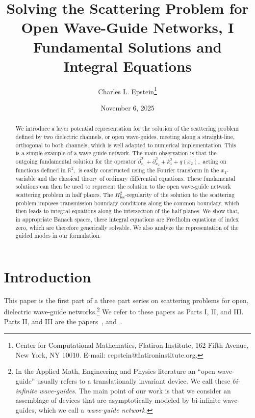 \documentclass[11pt]{article}
\newcommand{\Bk}{\color{black}}
\newcommand{\Rd}{\color{black}}
\newcommand\loc{\operatorname{loc}}
\newcommand\bbR{\mathbb R}
\newcommand\pa{\partial}
\theoremstyle{definition}
\theoremstyle{remark}
\begin{document}
\title{Solving the Scattering Problem for Open Wave-Guide Networks,
  I\\Fundamental Solutions and Integral Equations}

\author{Charles L. Epstein\footnote{ Center for Computational Mathematics, 
  Flatiron Institute, 162 Fifth Avenue, New York, NY 10010. E-mail:
  {cepstein@flatironinstitute.org}. }}
\date{November 6, 2025}
\maketitle



\begin{abstract} We introduce a  layer potential representation for the solution
  of the scattering problem defined by two dielectric channels, or open
  wave-guides, meeting along a straight-line, orthogonal to both channels, which
  is well adapted to numerical implementation. This is a simple example of a
  wave-guide network. The main observation is that the outgoing fundamental
  solution for the operator $\pa_{x_1}^2+\pa_{x_2}^2 +k_1^2+q(x_2),$ acting on
  functions defined in $\bbR^2,$ is easily constructed using the Fourier
  transform in the $x_1$-variable and the classical theory of ordinary
  differential equations. These fundamental solutions can then be used to
  represent the solution to the open wave-guide network scattering problem in half
  planes. The $H^2_{\loc}$-regularity of the solution to the scattering problem
  imposes transmission boundary conditions along the common boundary, which then
  leads to integral equations along the intersection of the half planes.  We
  show that, in appropriate Banach spaces, these integral equations are Fredholm
  equations of index zero, which are therefore generically solvable.  We also
  analyze the representation of the guided modes in our formulation.
\end{abstract}

\tableofcontents

\section{Introduction}
This paper is the first part of a three part series on scattering problems for
open, dielectric wave-guide \Rd networks.\footnote{\Rd In the Applied Math,
Engineering and Physics literature an ``open wave-guide'' usually refers to a
translationally invariant device.  We call these {\em bi-infinite wave-guides.}
The main point of our work is that we consider an assemblage of devices that are
asymptotically modeled by bi-infinite wave-guides, which we call a {\em
  wave-guide network.} \Bk} \Bk We refer to these papers as Parts I, II, and
III. Parts II, and III are the papers~\cite{EpWG2023_2}, and~\cite{EpMaSR2023}.
\end{document}
